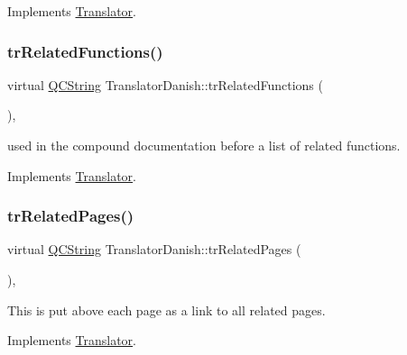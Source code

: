 Implements \mbox{\hyperlink{class_translator}{Translator}}.

\mbox{\label{class_translator_danish_a8eea9b76bc53e93ee50aa683c22e11d8}} 
\subsubsection{\texorpdfstring{trRelatedFunctions()}{trRelatedFunctions()}}
{\footnotesize\ttfamily virtual \mbox{\hyperlink{class_q_c_string}{Q\+C\+String}} Translator\+Danish\+::tr\+Related\+Functions (\begin{DoxyParamCaption}{ }\end{DoxyParamCaption})\hspace{0.3cm}{\ttfamily [inline]}, {\ttfamily [virtual]}}

used in the compound documentation before a list of related functions. 

Implements \mbox{\hyperlink{class_translator}{Translator}}.

\mbox{\label{class_translator_danish_a7acc39389eeb513a72caaf28a50f09fa}} 
\subsubsection{\texorpdfstring{trRelatedPages()}{trRelatedPages()}}
{\footnotesize\ttfamily virtual \mbox{\hyperlink{class_q_c_string}{Q\+C\+String}} Translator\+Danish\+::tr\+Related\+Pages (\begin{DoxyParamCaption}{ }\end{DoxyParamCaption})\hspace{0.3cm}{\ttfamily [inline]}, {\ttfamily [virtual]}}

This is put above each page as a link to all related pages. 

Implements \mbox{\hyperlink{class_translator}{Translator}}.

\mbox{\label{class_translator_danish_aff794706fde2eb4e4f6b1a9497ce4acf}} 
